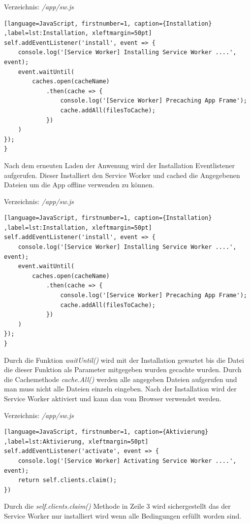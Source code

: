 Verzeichnis: \textit{/app/sw.js}

\begin{lstlisting}[language=JavaScript, firstnumber=1, caption={Installation} ,label=lst:Installation, xleftmargin=50pt]
self.addEventListener('install', event => {
    console.log('[Service Worker] Installing Service Worker ....', event);
    event.waitUntil(
        caches.open(cacheName)
            .then(cache => {
                console.log('[Service Worker] Precaching App Frame');
                cache.addAll(filesToCache);
            })
    )
});
}
\end{lstlisting}

Nach dem erneuten Laden der Anwenung wird der Installation Eventlistener aufgerufen. Dieser Installiert den Service Worker und cached die Angegebenen Dateien um die App offline verwenden zu können. 

Verzeichnis: \textit{/app/sw.js}

\begin{lstlisting}[language=JavaScript, firstnumber=1, caption={Installation} ,label=lst:Installation, xleftmargin=50pt]
self.addEventListener('install', event => {
    console.log('[Service Worker] Installing Service Worker ....', event);
    event.waitUntil(
        caches.open(cacheName)
            .then(cache => {
                console.log('[Service Worker] Precaching App Frame');
                cache.addAll(filesToCache);
            })
    )
});
}
\end{lstlisting}

Durch die Funktion \textit{waitUntil()} wird mit der Installation gewartet bis die Datei die dieser Funktion als Parameter mitgegeben wurden gecachte wurden. Durch die Cachemethode \textit{cache.All()} werden alle angegeben Dateien aufgerufen und man muss nicht alle Dateien einzeln eingeben.
Nach der Installation wird der Service Worker aktiviert und kann dan vom Browser verwendet werden.

Verzeichnis: \textit{/app/sw.js}

\begin{lstlisting}[language=JavaScript, firstnumber=1, caption={Aktivierung} ,label=lst:Aktivierung, xleftmargin=50pt]
self.addEventListener('activate', event => {
    console.log('[Service Worker] Activating Service Worker ....', event);
    return self.clients.claim();
})
\end{lstlisting}

Durch die \textit{self.clients.claim()} Methode in Zeile 3 wird sichergestellt das der Service Worker nur installiert wird wenn alle Bedingungen erfüllt worden sind.

